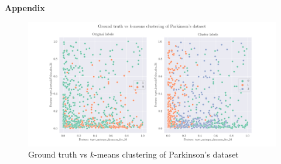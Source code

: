 \documentclass[12pt]{article}
\begin{document}
\pagebreak

\large{\textbf{Appendix}\vskip 0.3cm}



\begin{figure}[H]
  \centering
  \includegraphics[width=\textwidth]{../assets/parkinsons.png}
  \caption{Ground truth vs $k$-means clustering of Parkinson's dataset}
  \label{fig:diagnoses-plots}
\end{figure}
\end{document}
